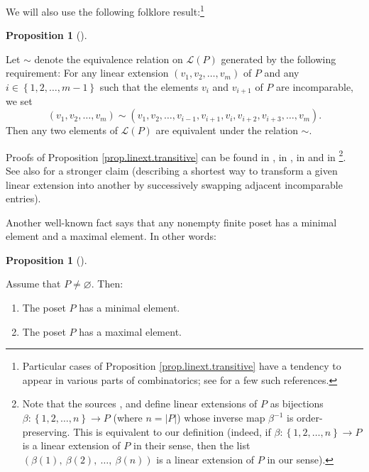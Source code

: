\documentclass[numbers=enddot,12pt,final,onecolumn,notitlepage]{scrartcl}%
\theoremstyle{definition}
\newtheorem{prop}[theo]{Proposition}
\newenvironment{proposition}[1][]
{\begin{prop}[#1]\begin{leftbar}}
{\end{leftbar}\end{prop}}
\begin{document}
We will also use the following folklore result:\footnote{Particular cases of
Proposition \ref{prop.linext.transitive} have a tendency to appear in various
parts of combinatorics; see \cite[Proposition 1.3]{DefKra21} for a few such
references.}

\begin{proposition}
\label{prop.linext.transitive}Let $\sim$ denote the equivalence relation on
$\mathcal{L}\left(  P\right)  $ generated by the following requirement: For
any linear extension $\left(  v_{1},v_{2},\ldots,v_{m}\right)  $ of $P$ and
any $i\in\left\{  1,2,\ldots,m-1\right\}  $ such that the elements $v_{i}$ and
$v_{i+1}$ of $P$ are incomparable, we set
\[
\left(  v_{1},v_{2},\ldots,v_{m}\right)  \sim\left(  v_{1},v_{2}%
,\ldots,v_{i-1},v_{i+1},v_{i},v_{i+2},v_{i+3},\ldots,v_{m}\right)  .
\]
Then any two elements of $\mathcal{L}\left(  P\right)  $ are equivalent under
the relation $\sim$.
\end{proposition}

Proofs of Proposition \ref{prop.linext.transitive} can be found in
\cite[Proposition 1.7]{bir-row-arxiv}, in \cite[Proposition 4.1 (for the
$\pi^{\prime}=\pi\tau_{j}$ case)]{ayyer-klee-schilling}, in \cite[Lemma
1]{etienne} and in \cite[Lemma 4.2]{Gyoja86}\footnote{Note that the sources
\cite{ayyer-klee-schilling}, \cite{etienne} and \cite{Gyoja86} define linear
extensions of $P$ as bijections $\beta:\left\{  1,2,\ldots,n\right\}
\rightarrow P$ (where $n=\left\vert P\right\vert $) whose inverse map
$\beta^{-1}$ is order-preserving. This is equivalent to our definition
(indeed, if $\beta:\left\{  1,2,\ldots,n\right\}  \rightarrow P$ is a linear
extension of $P$ in their sense, then the list $\left(  \beta\left(  1\right)
,\ \beta\left(  2\right)  ,\ \ldots,\ \beta\left(  n\right)  \right)  $ is a
linear extension of $P$ in our sense).}. See also \cite[Proposition
2.2]{Naatz00} for a stronger claim (describing a shortest way to transform a
given linear extension into another by successively swapping adjacent
incomparable entries).

Another well-known fact says that any nonempty finite poset has a minimal
element and a maximal element. In other words:

\begin{proposition}
\label{prop.poset-minmax} Assume that $P \neq\varnothing$. Then:

\begin{enumerate}
\item[\textbf{(a)}] The poset $P$ has a minimal element.

\item[\textbf{(b)}] The poset $P$ has a maximal element.
\end{enumerate}
\end{proposition}
\end{document}
